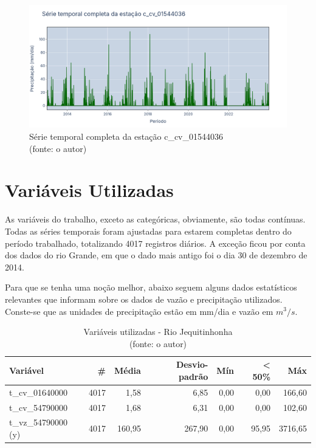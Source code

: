 \begin{figure}[!h]
	\centering
	\includegraphics[scale=0.25]{Figuras/rio_sao_francisco/franciscoSerieCompleta_c_cv_01544036.png}
	\caption{Série temporal completa da estação c\_cv\_01544036\\(fonte: o autor)}
	\label{fig:franciscoSerieCompleta_c_cv_01544036}
\end{figure}
\clearpage

\section{Variáveis Utilizadas}

As variáveis do trabalho, exceto as categóricas, obviamente, são todas contínuas. Todas as séries temporais foram ajustadas para estarem completas dentro do período trabalhado, totalizando 4017 registros diários. A exceção ficou por conta dos dados do rio Grande, em que o dado mais antigo foi o dia 30 de dezembro de 2014.

Para que se tenha uma noção melhor, abaixo seguem alguns dados estatísticos relevantes que informam sobre os dados de vazão e precipitação utilizados. Conste-se que as unidades de precipitação estão em mm/dia e vazão em $m^3/s$.

\begin{table}[!h]
	\centering \small
	\caption{Variáveis utilizadas - Rio Jequitinhonha \\(fonte: o autor)}
	\begin{tabular}{|l|r|r|r|r|r|r|} \hline 
		\textbf{Variável}   & \textbf{\#} & \textbf{Média} & \textbf{Desvio-padrão} & \textbf{Mín} & \textbf{< 50\%} & \textbf{Máx} \\\hline
		t\_cv\_01640000     & 4017        & 1,58           & 6,85                   & 0,00         & 0,00            & 166,60       \\\hline
		t\_cv\_54790000     & 4017        & 1,68           & 6,31                   & 0,00         & 0,00            & 102,60       \\\hline
		t\_vz\_54790000 (y) & 4017        & 160,95         & 267,90                 & 0,00         & 95,95           & 3716,65      \\\hline
	\end{tabular}
	\label{tab:variaveis_jequitinhonha}
\end{table}

